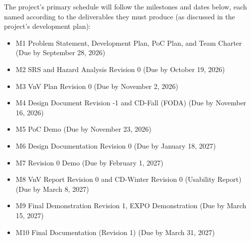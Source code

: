 The project's primary schedule will follow the milestones and dates below, each 
named according to the deliverables they must produce (as discussed in the 
project's development plan):

\begin{itemize}
	\item M1 Problem Statement, Development Plan, PoC Plan, and Team Charter 
	(Due by September 28, 2026)
	\item M2 SRS and Hazard Analysis Revision 0 (Due by October 19, 2026)
	\item M3 VnV Plan Revision 0 (Due by November 2, 2026)
	\item M4 Design Document Revision -1 and CD-Fall (FODA) (Due by November 
	16, 2026)
	\item M5 PoC Demo (Due by November 23, 2026)
	\item M6 Design Documentation Revision 0 (Due by January 18, 2027)
	\item M7 Revision 0 Demo (Due by February 1, 2027)
	\item M8 VnV Report Revision 0 and CD-Winter Revision 0 (Usability Report) 
	(Due by March 8, 2027)
	\item M9 Final Demonstration Revision 1, EXPO Demonstration (Due by March 
	15, 2027)
	\item M10 Final Documentation (Revision 1) (Due by March 31, 2027)
\end{itemize}